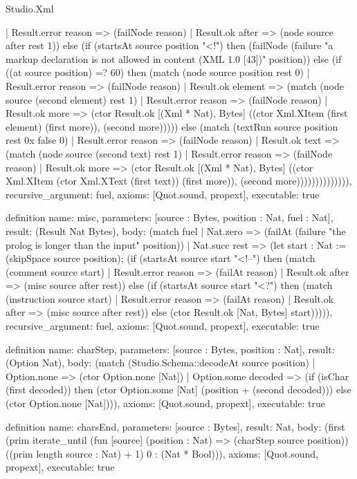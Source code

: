 \begin{lexlean}{Studio.Xml}
\begin{semanticmodule}
{      | Result.error reason => (failNode reason)
      | Result.ok after => (node source after rest 1)) else (if (startsAt source position "<!") then (failNode (failure "a markup declaration is not allowed in content (XML 1.0 [43])" position)) else (if ((at source position) =? 60) then (match (node source position rest 0)
      | Result.error reason => (failNode reason)
      | Result.ok element => (match (node source (second element) rest 1)
      | Result.error reason => (failNode reason)
      | Result.ok more => (ctor Result.ok [(Xml * Nat), Bytes] ((ctor Xml.XItem (first element) (first more)), (second more))))) else (match (textRun source position rest 0x false 0)
      | Result.error reason => (failNode reason)
      | Result.ok text => (match (node source (second text) rest 1)
      | Result.error reason => (failNode reason)
      | Result.ok more => (ctor Result.ok [(Xml * Nat), Bytes] ((ctor Xml.XItem (ctor Xml.XText (first text)) (first more)), (second more)))))))))))))),
  recursive_argument: fuel,
  axioms: [Quot.sound, propext],
  executable: true
}

definition{
  name: misc,
  parameters: [source : Bytes, position : Nat, fuel : Nat],
  result: (Result Nat Bytes),
  body: (match fuel
    | Nat.zero => (failAt (failure "the prolog is longer than the input" position))
    | Nat.succ rest => (let start : Nat := (skipSpace source position); (if (startsAt source start "<!--") then (match (comment source start)
      | Result.error reason => (failAt reason)
      | Result.ok after => (misc source after rest)) else (if (startsAt source start "<?") then (match (instruction source start)
      | Result.error reason => (failAt reason)
      | Result.ok after => (misc source after rest)) else (ctor Result.ok [Nat, Bytes] start))))),
  recursive_argument: fuel,
  axioms: [Quot.sound, propext],
  executable: true
}

definition{
  name: charStep,
  parameters: [source : Bytes, position : Nat],
  result: (Option Nat),
  body: (match (Studio.Schema::decodeAt source position)
    | Option.none => (ctor Option.none [Nat])
    | Option.some decoded => (if (isChar (first decoded)) then (ctor Option.some [Nat] (position + (second decoded))) else (ctor Option.none [Nat]))),
  axioms: [Quot.sound, propext],
  executable: true
}

definition{
  name: charsEnd,
  parameters: [source : Bytes],
  result: Nat,
  body: (first (prim iterate_until (fun [source] (position : Nat) => (charStep source position)) ((prim length source : Nat) + 1) 0 : (Nat * Bool))),
  axioms: [Quot.sound, propext],
  executable: true
}


\end{semanticmodule}
\end{lexlean}
